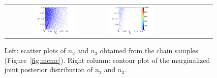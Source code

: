  \begin{figure}[ht]
        \begin{tabular}{clc}
\includegraphics[width=0.475\textwidth]{./figures/sample.pdf} &
\includegraphics[width=0.475\textwidth]{./figures/jpdf.pdf} \\
        \end{tabular}
        \caption{Left: scatter plots of $n_2$ and $n_3$ obtained from the
chain samples (Figure~\ref{fig:mcmc}). 
Right column: contour plot of the marginalized joint posterior distribution of  $n_2$ and $n_3$.}
\label{fig:pdfs} 
        \end{figure}
